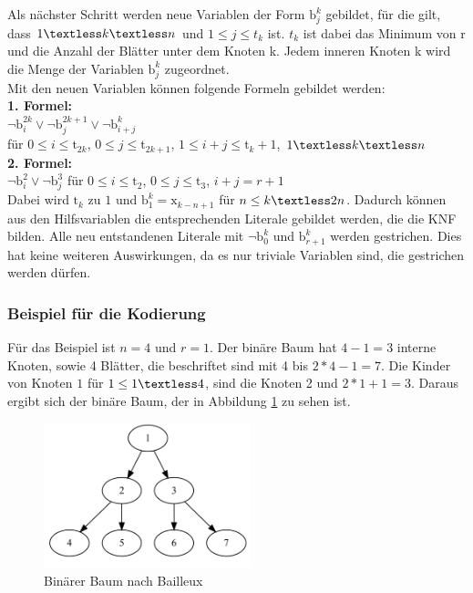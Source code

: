 \documentclass[a4,abstract=on]{scrartcl}
\begin{document}
Als nächster Schritt werden neue Variablen der Form $\text{b}_j^k$ gebildet, für die gilt, dass $1 \textless k \textless n$ und  $1 \leq j \leq t_k$ ist. $t_k$ ist dabei das Minimum von r und die Anzahl der Blätter unter dem Knoten k. Jedem inneren Knoten k wird die Menge der Variablen $\text{b}_j^k$ zugeordnet.\\
Mit den neuen Variablen können folgende Formeln gebildet werden:\\
\textbf{1. Formel:}\\
$ \neg \text{b}_i^{2k} \vee \neg \text{b}_j^{2k+1} \vee \neg \text{b}_{i+j}^{k}$ \\
für $0\leq i \leq \text{t}_{2k}$, $0\leq j \leq \text{t}_{2k+1}$, $1\leq i+j \leq \text{t}_{k}+1$, $1\textless k \textless n$\\
\textbf{2. Formel:}\\
$ \neg \text{b}_i^2 \vee \neg \text{b}_j^3$ für $0\leq i \leq \text{t}_2$, $0\leq j \leq \text{t}_3$, $i+j = r+1$\\

Dabei wird $\text{t}_k$ zu $1$ und $\text{b}_1^k = \text{x}_{k-n+1}$ für $n \leq k \textless 2n$. Dadurch können aus den Hilfsvariablen die entsprechenden Literale gebildet werden, die die KNF bilden.
Alle neu entstandenen Literale mit $\neg \text{b}_0^k$ und $\text{b}_{r+1}^k$ werden gestrichen. Dies hat keine weiteren Auswirkungen, da es nur triviale Variablen sind, die gestrichen werden dürfen.



\subsubsection{Beispiel für die Kodierung}
Für das Beispiel ist $n=4$ und $r =1$. Der binäre Baum hat $4-1 = 3$ interne Knoten, sowie 4 Blätter, die beschriftet sind mit 4 bis $2*4-1=7$. Die Kinder von Knoten $1$  für $1 \leq 1 \textless 4$, sind die Knoten 2 und $2*1 +1=3$. Daraus ergibt sich der binäre Baum, der in Abbildung \ref{fig:baum} zu sehen ist.

\begin{figure}[H]
\centering
\includegraphics[width=6cm]{Bailleux_baum.png}
\caption{Binärer Baum nach Bailleux}
\label{fig:baum}
\end{figure}
\end{document}
